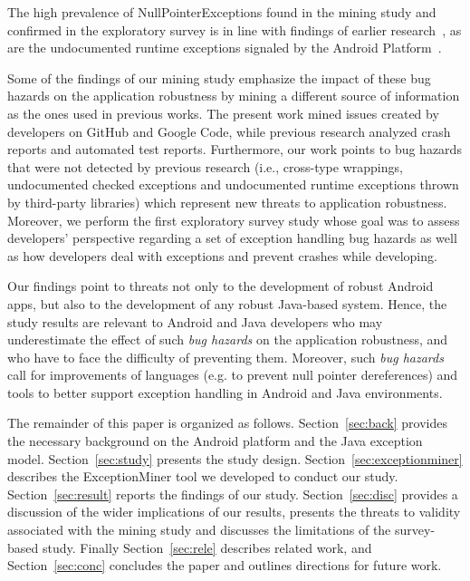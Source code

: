  The high prevalence of NullPointerExceptions found in the mining study and confirmed in the exploratory survey
 is in line with findings of earlier research~\cite{kim2013predicting,fraser20131600,csallner2004jcrasher}, 
as are the undocumented runtime exceptions signaled by the Android Platform~\cite{kechagia2014}. 

Some of the findings of our mining study emphasize the impact of these bug hazards on the application robustness 
by mining a different source of information as the ones used in previous works. The present work 
mined issues created by developers on GitHub and Google Code, while  previous research analyzed crash reports and automated test reports.
 Furthermore, our work points to bug hazards that were not detected by previous research (i.e., cross-type wrappings, undocumented checked exceptions and undocumented runtime exceptions thrown by third-party libraries) which represent new threats to application robustness.
Moreover, we perform  the first exploratory survey study whose
goal was to assess developers' perspective regarding a set of exception handling bug hazards
as well as how developers deal with exceptions and prevent crashes while developing.

Our findings point to threats not only to the development of robust Android apps, 
but also to the development of any robust Java-based system. 
Hence, the study results are relevant to Android and Java developers who may underestimate the effect of such
 \emph{bug hazards} on the application robustness,
and who have to face the difficulty of preventing them.
Moreover, such \emph{bug hazards} 
call for improvements of languages (e.g. to prevent null pointer dereferences) and tools to better support exception handling in Android and Java environments.

The remainder of this paper is organized as follows. 
Section~\ref{sec:back} provides the necessary
background on the Android platform and the Java exception model. 
Section~\ref{sec:study} presents the study design. 
Section~\ref{sec:exceptionminer} describes the ExceptionMiner tool we developed to conduct our study.
Section~\ref{sec:result} reports the findings of our study.
Section~\ref{sec:disc} provides a discussion of the wider implications of our results,
 presents the threats to validity associated with the mining study and discusses the limitations
of the survey-based study. 
Finally Section~\ref{sec:rele} describes related work, 
and Section~\ref{sec:conc} concludes the paper and outlines
directions for future work.
